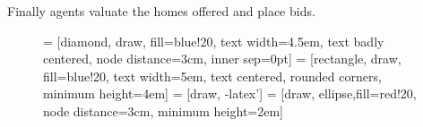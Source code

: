 Finally agents valuate the homes offered and place bids. %

%
%
%

\begin{figure}
    \begin{center}
  = [diamond, draw, fill=blue!20, 
     text width=4.5em, text badly centered, node distance=3cm, inner sep=0pt]
  = [rectangle, draw, fill=blue!20, 
     text width=5em, text centered, rounded corners, minimum height=4em]
  = [draw, -latex']
  = [draw, ellipse,fill=red!20, node distance=3cm,
     minimum height=2em]
%
 \begin{center}
 \end{center}
    \caption{}
    \label{fig:code_worker_choice}
    \end{center}
\end{figure}

